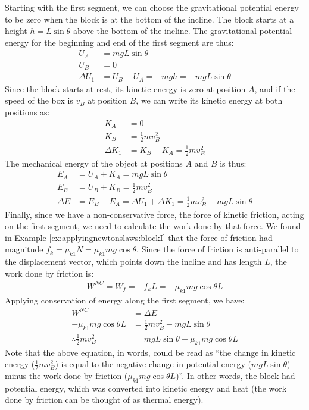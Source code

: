 \begin{example}
Starting with the first segment, we can choose the gravitational potential energy to be zero when the block is at the bottom of the incline. The block starts at a height $h=L\sin\theta$ above the  bottom of the incline. The gravitational potential energy for the beginning and end of the first segment are thus:
\begin{align*}
U_A &= mgL\sin\theta\\
U_B &= 0\\
\Delta U_1 &= U_B-U_A = -mgh = -mgL\sin\theta
\end{align*}
Since the block starts at rest, its kinetic energy is zero at position $A$, and if the speed of the box is $v_B$ at position $B$, we can write its kinetic energy at both positions as:
\begin{align*}
K_A &=0\\
K_B &= \frac{1}{2}mv_B^2\\
\Delta K_1 &=K_B-K_A= \frac{1}{2}mv_B^2
\end{align*}
The mechanical energy of the object at positions $A$ and $B$ is thus:
\begin{align*}
E_A &= U_A+K_A = mgL\sin\theta\\
E_B &= U_B+K_B = \frac{1}{2}mv_B^2\\
\Delta E &= E_B - E_A = \Delta U_1+\Delta K_1= \frac{1}{2}mv_B^2 - mgL\sin\theta
\end{align*}
Finally, since we have a non-conservative force, the force of kinetic friction, acting on the first segment, we need to calculate the work done by that force. We found in Example \ref{ex:applyingnewtonslaws:blockI} that the force of friction had magnitude $f_k=\mu_{k1}N=\mu_{k1}mg\cos\theta$. Since the force of friction is anti-parallel to the displacement vector, which points down the incline and has length $L$, the work done by friction is:
\begin{align*}
W^{NC}=W_f = -f_kL=-\mu_{k1}mg\cos\theta L
\end{align*}
Applying conservation of energy along the first segment, we have:
\begin{align*}
W^{NC} &= \Delta E\\
-\mu_{k1}mg\cos\theta L &= \frac{1}{2}mv_B^2 - mgL\sin\theta\\
\therefore \frac{1}{2}mv_B^2 &= mgL\sin\theta-\mu_{k1}mg\cos\theta L 
\end{align*}
Note that the above equation, in words, could be read as ``the change in kinetic energy ($\frac{1}{2}mv_B^2$) is equal to the negative change in potential energy ($mgL\sin\theta$) minus the work done by friction ($\mu_{k1}mg\cos\theta L$)''. In other words, the block had potential energy, which was converted into kinetic energy and heat (the work done by friction can be thought of as thermal energy). 


\end{example}
